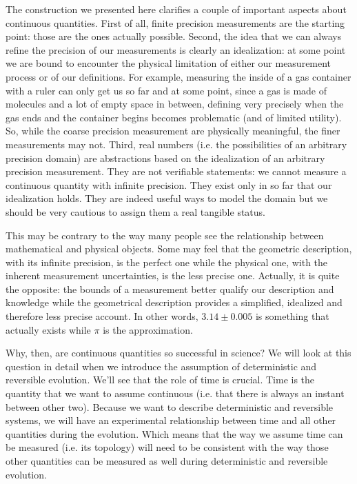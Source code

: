 \documentclass[11pt,letterpaper,fleqn]{memoir} %
\begin{document}
The construction we presented here clarifies a couple of important aspects about continuous quantities. First of all, finite precision measurements are the starting point: those are the ones actually possible. Second, the idea that we can always refine the precision of our measurements is clearly an idealization: at some point we are bound to encounter the physical limitation of either our measurement process or of our definitions. For example, measuring the inside of a gas container with a ruler can only get us so far and at some point, since a gas is made of molecules and a lot of empty space in between, defining very precisely when the gas ends and the container begins becomes problematic (and of limited utility). So, while the coarse precision measurement are physically meaningful, the finer measurements may not. Third, real numbers (i.e. the possibilities of an arbitrary precision domain) are abstractions based on the idealization of an arbitrary precision measurement. They are not verifiable statements: we cannot measure a continuous quantity with infinite precision. They exist only in so far that our idealization holds. They are indeed useful ways to model the domain but we should be very cautious to assign them a real tangible status.

This may be contrary to the way many people see the relationship between mathematical and physical objects. Some may feel that the geometric description, with its infinite precision, is the perfect one while the physical one, with the inherent measurement uncertainties, is the less precise one. Actually, it is quite the opposite: the bounds of a measurement better qualify our description and knowledge while the geometrical description provides a simplified, idealized and therefore less precise account. In other words, $3.14 \pm 0.005$ is something that actually exists while $\pi$ is the approximation.

Why, then, are continuous quantities so successful in science? We will look at this question in detail when we introduce the assumption of deterministic and reversible evolution. We'll see that the role of time is crucial. Time is the quantity that we want to assume continuous (i.e. that there is always an instant between other two). Because we want to describe deterministic and reversible systems, we will have an experimental relationship between time and all other quantities during the evolution. Which means that the way we assume time can be measured (i.e. its topology) will need to be consistent with the way those other quantities can be measured as well during deterministic and reversible evolution.
\end{document}
